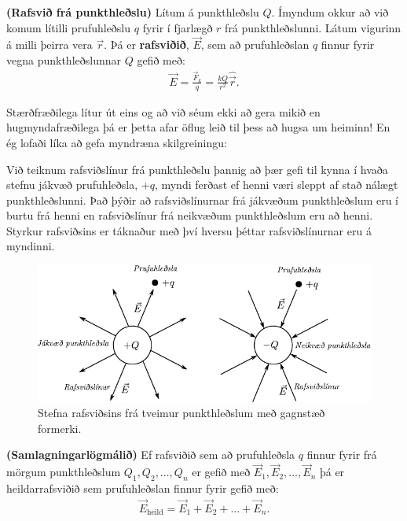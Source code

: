 \begin{tcolorbox}
\begin{definition}
\textbf{(Rafsvið frá punkthleðslu)} Lítum á punkthleðslu $Q$. Ímyndum okkur að við komum lítilli prufuhleðslu $q$ fyrir í fjarlægð $r$ frá punkthleðslunni. Látum vigurinn á milli þeirra vera $\Vec{r}$. Þá er \textbf{rafsviðið}, $\vec{E}$, sem að prufuhleðslan $q$ finnur fyrir vegna punkthleðslunnar $Q$ gefið með:
\begin{align*}
    \Vec{E} = \frac{\vec{F}_k}{q}= \frac{kQ}{r^2} \hat{\vec{r}}.
\end{align*}
\end{definition}
\end{tcolorbox}

Stærðfræðilega lítur út eins og að við séum ekki að gera mikið en hugmyndafræðilega þá er þetta afar öflug leið til þess að hugsa um heiminn! En ég lofaði líka að gefa myndræna skilgreiningu:


\begin{tcolorbox}
Við teiknum rafsviðslínur frá punkthleðslu þannig að þær gefi til kynna í hvaða stefnu jákvæð prufuhleðsla, $+q$, myndi ferðast ef henni væri sleppt af stað nálægt punkthleðslunni. Það þýðir að rafsviðslínurnar frá jákvæðum punkthleðslum eru í burtu frá henni en rafsviðslínur frá neikvæðum punkthleðslum eru að henni. Styrkur rafsviðsins er táknaður með því hversu þéttar rafsviðslínurnar eru á myndinni.
\begin{figure}[H]
    \centering
    \includegraphics{figures/prufuhledslur.pdf}
    \caption{Stefna rafsviðsins frá tveimur punkthleðslum með gagnstæð formerki.}
\end{figure}
\end{tcolorbox}

\begin{tcolorbox}
\begin{theorem}
\textbf{(Samlagningarlögmálið)} Ef rafsviðið sem að prufuhleðsla $q$ finnur fyrir frá mörgum punkthleðslum $Q_1, Q_2, \ldots, Q_n$ er gefið með $\vec{E}_1, \vec{E}_2, \ldots, \vec{E}_n$ þá er heildarrafsviðið sem prufuhleðslan finnur fyrir gefið með:
\begin{align*}
    \vec{E}_{\text{heild}} = \vec{E}_1 + \vec{E}_2 + \ldots + \vec{E}_n.
\end{align*}
\end{theorem}
\end{tcolorbox}

